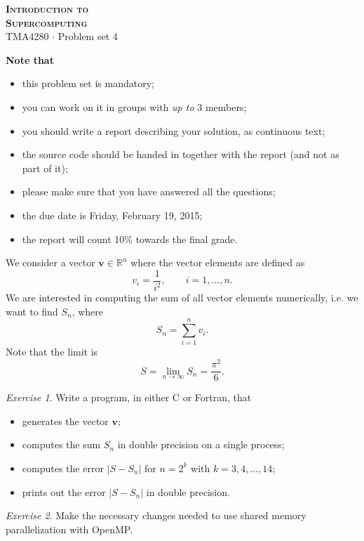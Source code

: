 \documentclass[onecolumn, oneside, a4paper, 11pt]{memoir}
\theoremstyle{remark}
\newtheorem{ex}{Exercise}
\begin{document}
\pagestyle{empty}

\begin{center}
  {\Huge \bfseries \scshape
    Introduction to \\[0.2\baselineskip] Supercomputing} \\[2\baselineskip]
  {\Large TMA4280 $\cdot$ Problem set 4} \\[2\baselineskip]
\end{center}

\textbf{Note that}
\begin{itemize}
\item this problem set is mandatory;
\item you can work on it in groups with \emph{up to} 3 members;
\item you should write a report describing your solution, as continuous text;
\item the source code should be handed in together with the report (and not as
  part of it);
\item please make sure that you have answered all the questions;
\item the due date is Friday, February 19, 2015;
\item the report will count 10\% towards the final grade.
\end{itemize}

We consider a vector $\bm v \in \mathbb{R}^n$ where the vector elements are
defined as
\[
  v_i = \frac{1}{i^2}, \qquad i=1,\ldots,n.
\]
We are interested in computing the sum of all vector elements numerically, i.e.
we want to find $S_n$, where
\[
  S_n = \sum_{i=1}^n v_i.
\]
Note that the limit is
\[
  S = \lim_{n\to\infty} S_n = \frac{\pi^2}{6}.
\]

\begin{ex}
  Write a program, in either C or Fortran, that
  \begin{itemize}
  \item generates the vector $\bm v$;
  \item computes the sum $S_n$ in double precision on a single process;
  \item computes the error $|S - S_n|$ for $n=2^k$ with $k=3,4,\ldots,14$;
  \item prints out the error $|S - S_n|$ in double precision.
  \end{itemize}
\end{ex}

\begin{ex}
  Make the necessary changes needed to use shared memory parallelization with
  OpenMP.
\end{ex}
\end{document}
